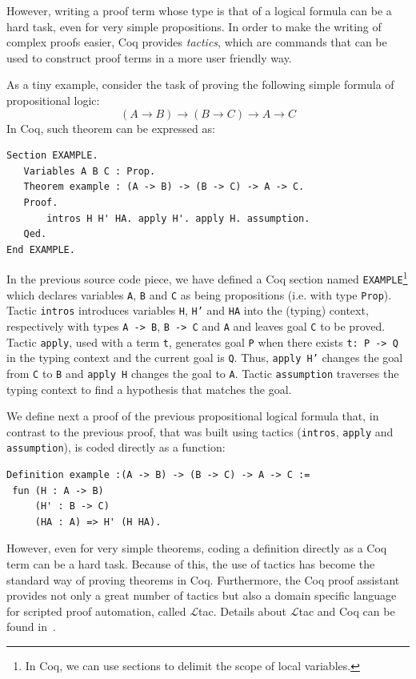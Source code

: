 \documentclass[sigconf]{acmart}
\begin{document}
However, writing a proof term whose type is that of a logical formula
can be a hard task, even for very simple propositions.  In order to
make the writing of complex proofs easier, Coq provides
\emph{tactics}, which are commands that can be used to construct proof
terms in a more user friendly way.

As a tiny example, consider the task of proving the following simple
formula of propositional logic:
\[
(A \to B)\to (B\to C) \to A \to C
\]
In Coq, such theorem can be expressed as:
\begin{verbatim}
Section EXAMPLE.
   Variables A B C : Prop.
   Theorem example : (A -> B) -> (B -> C) -> A -> C.
   Proof.
       intros H H' HA. apply H'. apply H. assumption. 
   Qed.
End EXAMPLE.
\end{verbatim}
In the previous source code piece, we have defined a Coq section named
\texttt{EXAMPLE}\footnote{In Coq, we can use sections to delimit the
  scope of local variables.} which declares variables \texttt{A},
\texttt{B} and \texttt{C} as being propositions (i.e. with type
\texttt{Prop}). Tactic \texttt{intros} introduces variables
\texttt{H}, \texttt{H'} and \texttt{HA} into the (typing) context,
respectively with types \texttt{A -> B}, \texttt{B -> C} and
\texttt{A} and leaves goal \texttt{C} to be proved. Tactic
\texttt{apply}, used with a term \texttt{t}, generates goal
\texttt{P}
when there exists \texttt{t: P -> Q} in the typing context and the
current goal is \texttt{Q}. Thus, \texttt{apply H'} changes the goal
from \texttt{C} to \texttt{B} and \texttt{apply H}
changes the goal to \texttt{A}. Tactic \texttt{assumption}
traverses the typing context to find a hypothesis that matches the goal.

We define next a proof of the previous propositional logical formula
that, in contrast to the previous proof, that was built using tactics
(\texttt{intros}, \texttt{apply} and \texttt{assumption}), is coded
directly as a function:
\begin{verbatim}
Definition example :(A -> B) -> (B -> C) -> A -> C :=
 fun (H : A -> B)
     (H' : B -> C)
     (HA : A) => H' (H HA).
\end{verbatim}
However, even for very simple theorems, coding a definition directly
as a Coq term can be a hard task. Because of this, the use of tactics
has become the standard way of proving theorems in Coq. Furthermore,
the Coq proof assistant provides not only a great number of tactics
but also a domain specific language for scripted proof automation,
called $\mathcal{L}$tac. Details about $\mathcal{L}$tac and Coq can be found
in~\cite{Chlipala13,Bertot10,manual_coq}.
\end{document}
